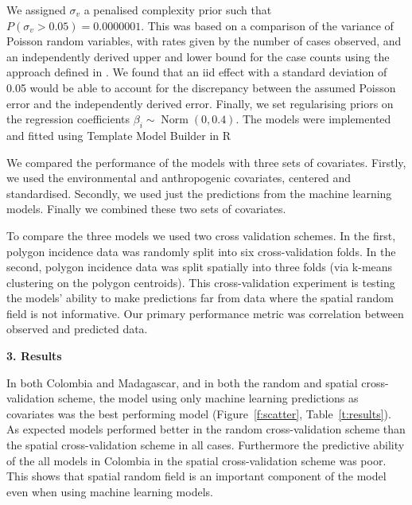 \documentclass[11pt]{article}
\begin{document}
We assigned $\sigma_v$ a penalised complexity prior \cite{simpson2017penalising} such that $P(\sigma_v > 0.05) = 0.0000001$. This was based on a comparison of the variance of Poisson random variables, with rates given by the number of cases observed, and an independently derived upper and lower bound for the case counts using the approach defined in \cite{cibulskis2011worldwide}. We found that an iid effect with a standard deviation of 0.05 would be able to account for the discrepancy between the assumed Poisson error and the independently derived error.
Finally, we set regularising priors on the regression coefficients $\beta_i \sim \operatorname{ Norm}(0, 0.4)$. 
The models were implemented and fitted using Template Model Builder \cite{TMB} in R \cite{R}

We compared the performance of the models with three sets of covariates.
Firstly, we used the environmental and anthropogenic covariates, centered and standardised.
Secondly, we used just the predictions from the machine learning models.
Finally we combined these two sets of covariates.

To compare the three models we used two cross validation schemes. 
In the first, polygon incidence data was randomly split into six cross-validation folds.
In the second, polygon incidence data was split spatially into three folds (via k-means clustering on the polygon centroids).
This cross-validation experiment is testing the models’ ability to make predictions far from data where the spatial random field is not informative.
Our primary performance metric was correlation between observed and predicted data.


{\bf 3. Results}


In both Colombia and Madagascar, and in both the random and spatial cross-validation scheme, the model using only machine learning predictions as covariates was the best performing model (Figure~\ref{f:scatter}, Table~\ref{t:results}).
As expected models performed better in the random cross-validation scheme than the spatial cross-validation scheme in all cases.
Furthermore the predictive ability of the all models in Colombia in the spatial cross-validation scheme was poor.
This shows that spatial random field is an important component of the model even when using machine learning models.
\end{document}
